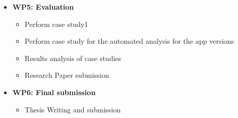 \begin{itemize}
\item{\textbf{ WP5: Evaluation}}
\begin{itemize}
\item{ Perform case study1}
\item{ Perform case study for the automated analysis for the app versions} 
\item{ Results analysis of case studies}
\item{ Research Paper submission\\}
\end{itemize}

\item{\textbf{ WP6: Final submission}}
\begin{itemize}
\item{ Thesis Writing and submission}
\end{itemize}
\end{itemize}


